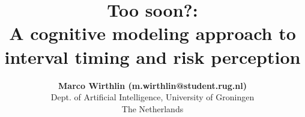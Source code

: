 \documentclass[10pt, a4paper, twocolumn]{article}
\begin{document}

\title{Too soon?:\\A cognitive modeling approach to interval timing and risk perception}

\author{{\large \bf Marco Wirthlin (m.wirthlin@student.rug.nl)} \\
Dept. of Artificial Intelligence, University of Groningen \\
The Netherlands}

\date{}
\maketitle









\end{document}
